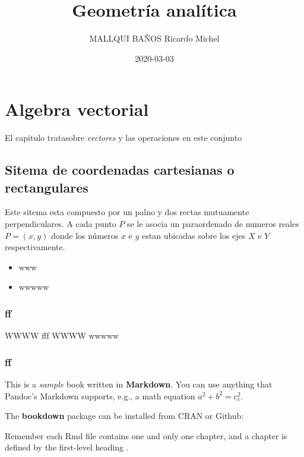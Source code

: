 \documentclass[12pt,]{report}
\title{Geometría analítica}
\author{MALLQUI BAÑOS Ricardo Michel}
\date{2020-03-03}
\providecommand{\tightlist}{%
  \setlength{\itemsep}{0pt}\setlength{\parskip}{0pt}}
\theoremstyle{slplain}
\begin{document}
\maketitle

{
\setcounter{tocdepth}{1}
\tableofcontents
}
\hypertarget{algebra-vectorial}{%
\chapter{Algebra vectorial}\label{algebra-vectorial}}

El capitulo tratasobre \emph{vectores} y las operaciones en este conjunto

\hypertarget{sitema-de-coordenadas-cartesianas-o-rectangulares}{%
\section{Sitema de coordenadas cartesianas o rectangulares}\label{sitema-de-coordenadas-cartesianas-o-rectangulares}}

Este sitema esta compuesto por un palno y dos rectas mutuamente perpendiculares. A cada punto \(P\) se le asocia un paraordenado de numeros reales \(P=(x,y)\) donde los números \(x\) e \(y\) estan ubicadas sobre los ejes \(X\) e \(Y\) respectivamente.

\begin{itemize}
\tightlist
\item
  www
\item
  wwwww
\end{itemize}

\hypertarget{ff}{%
\subsection{ff}\label{ff}}

WWWW fff
WWWW wwwww

\hypertarget{ff-1}{%
\subsection{ff}\label{ff-1}}

This is a \emph{sample} book written in \textbf{Markdown}. You can use anything that Pandoc's Markdown supports, e.g., a math equation \(a^2 + b^2 = c^2_c\).

The \textbf{bookdown} package can be installed from CRAN or Github:

Remember each Rmd file contains one and only one chapter, and a chapter is defined by the first-level heading .
\end{document}
